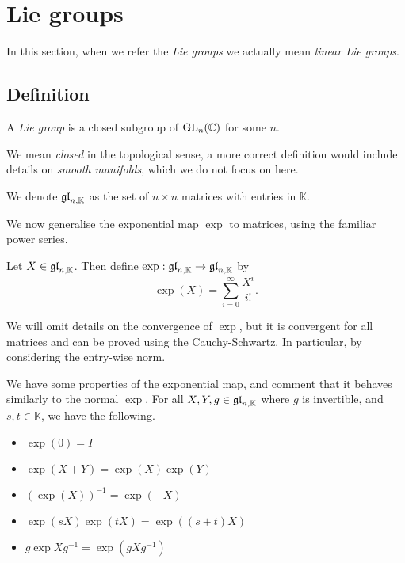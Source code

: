 \section{Lie groups}

In this section, when we refer the \emph{Lie groups} we actually mean \emph{linear Lie groups}.

\subsection{Definition}

\begin{definition}
    A \emph{Lie group} is a closed subgroup of $\GL_n(\C)$ for some $n$.
\end{definition}

We mean \emph{closed} in the topological sense, a more correct definition would include details on \emph{smooth manifolds}, which we do not focus on here.

We denote $\gl[n, \mathbb K]$ as the set of $n \times n$ matrices with entries in $\mathbb K$.

We now generalise the exponential map $\exp$ to matrices, using the familiar power series.

\begin{definition}
    Let $X \in \gl[n, \mathbb K]$. Then define $\exp: \gl[n, \mathbb K] \to \gl[n, \mathbb K]$ by
    \[ \exp(X) = \sum_{i=0}^\infty \frac{X^i}{i!}. \]
\end{definition}

We will omit details on the convergence of $\exp$, but it is convergent for all matrices and can be proved using the Cauchy-Schwartz. In particular, by considering the entry-wise norm.

We have some properties of the exponential map, and comment that it behaves similarly to the normal $\exp$. For all $X, Y, g \in \gl[n, \mathbb K]$ where $g$ is invertible, and $s, t \in \mathbb K$, we have the following.

\begin{itemize}
    \item $\exp(0) = I$
    \item $\exp(X + Y) = \exp(X) \exp(Y)$
    \item $(\exp(X))^{-1} = \exp(-X)$
    \item $\exp(sX)\exp(tX) = \exp((s+t)X)$
    \item $g\exp X g^{-1} = \exp(gXg^{-1})$
\end{itemize}

